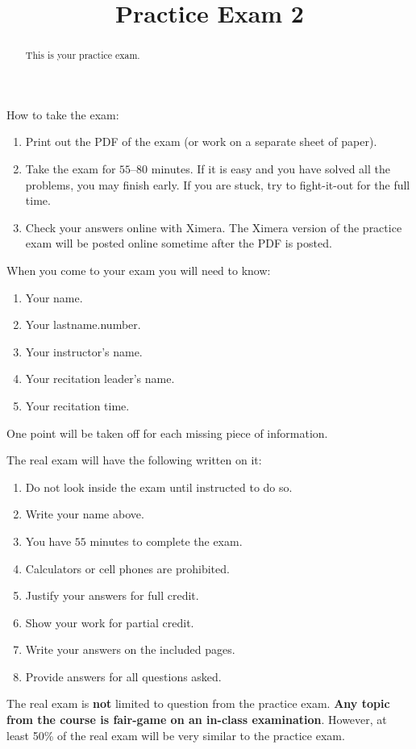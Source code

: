 \documentclass{ximera}
\title{Practice Exam 2}
\begin{document}
\begin{abstract}
This is your practice exam.
\end{abstract}
\maketitle
\thispagestyle{empty}

How to take the exam:
\begin{enumerate}
  \item Print out the PDF of the exam (or work on a separate sheet of paper).
  \item Take the exam for $55$--$80$ minutes. If it is easy and you have
    solved all the problems, you may finish early. If you are stuck,
    try to fight-it-out for the full time.
  \item Check your answers online with Ximera. The Ximera version of
    the practice exam will be posted online sometime after the PDF is
    posted.
\end{enumerate}


When you come to your exam you will need to know:
\begin{enumerate}
\item Your name.
\item Your lastname.number.
\item Your instructor's name.
\item Your recitation leader's name.
\item Your recitation time.
\end{enumerate}
One point will be taken off for each missing piece of information.

The real exam will have the following written on it:

\begin{enumerate}
\item Do not look inside the exam until instructed to do so.
\item Write your name above.
\item You have $55$ minutes to complete the exam.
\item Calculators or cell phones are prohibited.
\item Justify your answers for full credit.
\item Show your work for partial credit.
\item Write your answers on the included pages.
\item Provide answers for all questions asked.
\end{enumerate}

The real exam is \textbf{not} limited to question from the practice
exam. \textbf{Any topic from the course is fair-game on an in-class
  examination}.  However, at least 50\% of the real exam will be very
similar to the practice exam.
\end{document}
